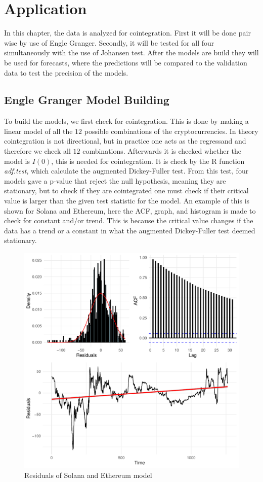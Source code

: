 \chapter{Application}
In this chapter, the data is analyzed for cointegration. First it will be done pair wise by use of Engle Granger. Secondly, it will be tested for all four simultaneously with the use of Johansen test. After the models are build they will be used for forecasts, where the predictions will be compared to the validation data to test the precision of the models.


\section{Engle Granger Model Building}
To build the models, we first check for cointegration. This is done by making a linear model of all the $12$ possible combinations of the cryptocurrencies. In theory cointegration is not directional, but in practice one acts as the regressand and therefore we check all $12$ combinations. Afterwards it is checked whether the model is $I(0)$, this is needed for cointegration. It is check by the R function \textit{adf.test}, which calculate the augmented Dickey-Fuller test. From this test, four models gave a p-value that reject the null hypothesis, meaning they are stationary, but to check if they are cointegrated one must check if their critical value is larger than the given test statistic for the model. An example of this is shown for Solana and Ethereum, here the ACF, graph, and histogram is made to check for constant and/or trend. This is because the critical value changes if the data has a trend or a constant in what the augmented Dickey-Fuller test deemed stationary.
\begin{figure}[h]
    \centering
    \includegraphics[width=0.4\linewidth]{1.Projekt_kode/Billeder/plot_grid_ADF_Solana-Ethereum.pdf}
    \caption{Residuals of Solana and Ethereum model}
    \label{fig:ADF_HIST_GRAPH_SOLANA_ETHEREUM}
\end{figure}

